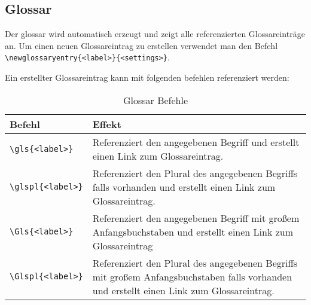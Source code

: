 \subsection{Glossar}
Der \gls{glossar} wird automatisch erzeugt und zeigt alle referenzierten Glossareinträge an. Um einen neuen Glossareintrag zu erstellen verwendet man den Befehl\\ \texttt{\textbackslash newglossaryentry\{<label>\}\{<settings>\}}.

Ein erstellter Glossareintrag kann mit folgenden befehlen referenziert werden:
\begin{table}[h!]
	\centering
	\caption[Glossar Befehle]{\label{tab:glossarTabelle}Glossar Befehle}
	\begin{tabular}{lp{10cm}}
		\textbf{Befehl} & \textbf{Effekt}\\\hline
		\texttt{\textbackslash gls\{<label>\}} & Referenziert den angegebenen Begriff und erstellt einen Link zum Glossareintrag.\\
		\texttt{\textbackslash glspl\{<label>\}} & Referenziert den Plural des angegebenen Begriffs falls vorhanden und erstellt einen Link zum Glossareintrag.\\
		\texttt{\textbackslash Gls\{<label>\}} & Referenziert den angegebenen Begriff mit großem Anfangsbuchstaben und erstellt einen Link zum Glossareintrag\\
		\texttt{\textbackslash Glspl\{<label>\}} & Referenziert den Plural des angegebenen Begriffs mit großem Anfangsbuchstaben falls vorhanden und erstellt einen Link zum Glossareintrag.\\\hline
	\end{tabular}
\end{table}
